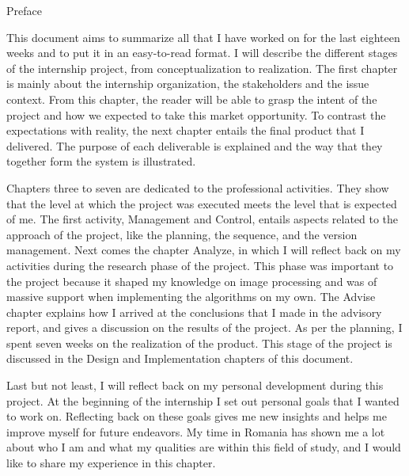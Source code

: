 \documentclass{matthijs}
\begin{document}
	\begin{hoofdstuk*}{Preface}

		\setlength\parindent{1.5em}
		\setlength{\parskip}{0.5em plus 0.2em minus 0.1em}
		\linespread{1.2}

		This document aims to summarize all that I have worked on for the last eighteen weeks and to put it in an easy-to-read format.
		I will describe the different stages of the internship project, from conceptualization to realization.
		The first chapter is mainly about the internship organization, the stakeholders and the issue context.
		From this chapter, the reader will be able to grasp the intent of the project and how we expected to take this market opportunity.
		To contrast the expectations with reality, the next chapter entails the final product that I delivered.
		The purpose of each deliverable is explained and the way that they together form the system is illustrated.

		Chapters three to seven are dedicated to the professional activities.
		They show that the level at which the project was executed meets the level that is expected of me.
		The first activity, Management and Control, entails aspects related to the approach of the project, like the planning, the sequence, and the version management.
		Next comes the chapter Analyze, in which I will reflect back on my activities during the research phase of the project.
		This phase was important to the project because it shaped my knowledge on image processing and was of massive support when implementing the algorithms on my own.
		The Advise chapter explains how I arrived at the conclusions that I made in the advisory report, and gives a discussion on the results of the project.
		As per the planning, I spent seven weeks on the realization of the product.
		This stage of the project is discussed in the Design and Implementation chapters of this document.

		Last but not least, I will reflect back on my personal development during this project.
		At the beginning of the internship I set out personal goals that I wanted to work on.
		Reflecting back on these goals gives me new insights and helps me improve myself for future endeavors.
		My time in Romania has shown me a lot about who I am and what my qualities are within this field of study, and I would like to share my experience in this chapter.


	\end{hoofdstuk*}
	
\end{document}
